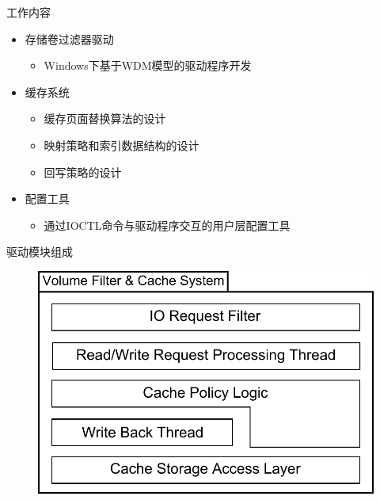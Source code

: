 \documentclass[compress]{beamer}
\begin{document}
\begin{frame}{工作内容}
\begin{itemize}
\item 存储卷过滤器驱动
    \begin{itemize}
    \item Windows下基于WDM模型的驱动程序开发
    \end{itemize}
\item 缓存系统
    \begin{itemize}
    \item 缓存页面替换算法的设计
    \item 映射策略和索引数据结构的设计
    \item 回写策略的设计
    \end{itemize}
\item 配置工具
    \begin{itemize}
    \item 通过IOCTL命令与驱动程序交互的用户层配置工具
    \end{itemize}
\end{itemize}
\end{frame}

\begin{frame}{驱动模块组成}
\begin{figure}
\includegraphics[width=0.8\linewidth]{../graph/sys-flt-arch}
\end{figure}
\end{frame}
\end{document}
